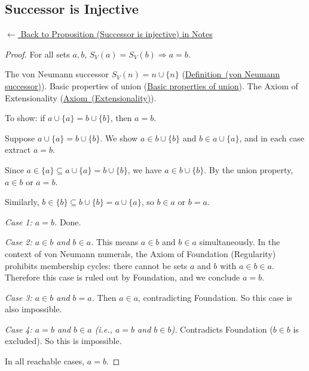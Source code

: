 
\subsection*{Successor is Injective}
\label{prf:vn-successor-injective}

\begin{remark*}[Return]
\hyperref[prop:vn-successor-injective]{$\leftarrow$ Back to Proposition (Successor is injective) in Notes}
\end{remark*}

\begin{proof}
\Claim For all sets $a, b$, $S_V(a) = S_V(b) \Rightarrow a = b$.

\Given The von Neumann successor $S_V(n) = n \cup \{n\}$
(\hyperref[def:vn-successor]{Definition~(von Neumann successor)}). Basic
properties of union (\hyperref[prop:union-basics]{Basic properties of union}).
The Axiom of Extensionality (\hyperref[ax:vn-extensionality]{Axiom~(Extensionality)}).

\Goal To show: if $a \cup \{a\} = b \cup \{b\}$, then $a = b$.

\Strategy Suppose $a \cup \{a\} = b \cup \{b\}$. We show $a \in b \cup \{b\}$
and $b \in a \cup \{a\}$, and in each case extract $a = b$.

Since $a \in \{a\} \subseteq a \cup \{a\} = b \cup \{b\}$, we have $a \in b
\cup \{b\}$. By the union property, $a \in b$ or $a = b$.

Similarly, $b \in \{b\} \subseteq b \cup \{b\} = a \cup \{a\}$, so $b \in a$
or $b = a$.

\medskip
\textit{Case 1: $a = b$.} Done.

\textit{Case 2: $a \in b$ and $b \in a$.} This means $a \in b$ and $b \in a$
simultaneously. In the context of von Neumann numerals, the Axiom of Foundation
(Regularity) prohibits membership cycles: there cannot be sets $a$ and $b$ with
$a \in b \in a$. Therefore this case is ruled out by Foundation, and we
conclude $a = b$.

\textit{Case 3: $a \in b$ and $b = a$.} Then $a \in a$, contradicting
Foundation. So this case is also impossible.

\textit{Case 4: $a = b$ and $b \in a$ (i.e., $a = b$ and $b \in b$).}
Contradicts Foundation ($b \in b$ is excluded). So this is impossible.

In all reachable cases, $a = b$. \AsReq
\end{proof}


